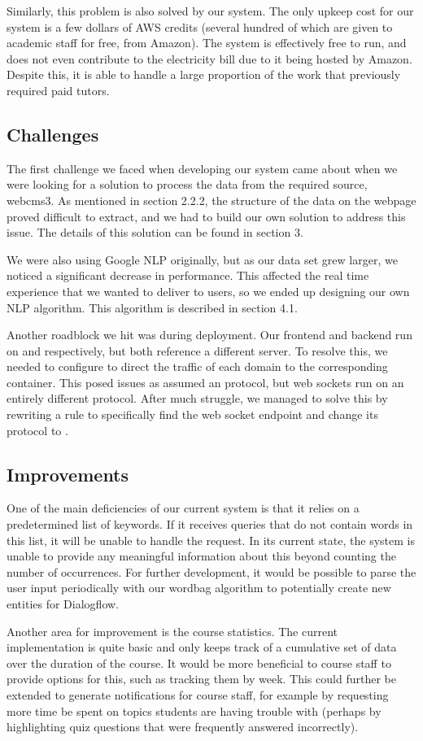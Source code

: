 Similarly, this problem is also solved by our system. The only upkeep cost for our system is a few dollars of AWS credits (several hundred of which are given to academic staff for free, from Amazon). The system is effectively free to run, and does not even contribute to the electricity bill due to it being hosted by Amazon. Despite this, it is able to handle a large proportion of the work that previously required paid tutors.

\subsection{Challenges}
The first challenge we faced when developing our system came about when we were looking for a solution to process the data from the required source, webcms3. As mentioned in section 2.2.2, the structure of the data on the webpage proved difficult to extract, and we had to build our own solution to address this issue. The details of this solution can be found in section 3.

We were also using Google NLP originally, but as our data set grew larger, we noticed a significant decrease in performance. This affected the real time experience that we wanted to deliver to users, so we ended up designing our own NLP algorithm. This algorithm is described in section 4.1.

Another roadblock we hit was during deployment. Our frontend and backend run on  and  respectively, but both reference a different server. To resolve this, we needed to configure  to direct the traffic of each domain to the corresponding  container. This posed issues as  assumed an  protocol, but web sockets run on an entirely different protocol. After much struggle, we managed to solve this by rewriting a rule to specifically find the web socket endpoint and change its protocol to .

\subsection{Improvements}
One of the main deficiencies of our current system is that it relies on a predetermined list of keywords. If it receives queries that do not contain words in this list, it will be unable to handle the request. In its current state, the system is unable to provide any meaningful information about this beyond counting the number of occurrences. For further development, it would be possible to parse the user input periodically with our wordbag algorithm to potentially create new entities for Dialogflow.

Another area for improvement is the course statistics. The current implementation is quite basic and only keeps track of a cumulative set of data over the duration of the course. It would be more beneficial to course staff to provide options for this, such as tracking them by week. This could further be extended to generate notifications for course staff, for example by requesting more time be spent on topics students are having trouble with (perhaps by highlighting quiz questions that were frequently answered incorrectly).

\newpage
